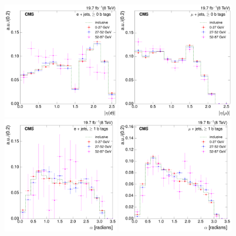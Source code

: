 \begin{figure}[hbtp]
    \centering
     \includegraphics[width=0.45\textwidth]{Chapters/07_08_09_Analysis/Images/8TeV/fit_variables/electron/MET/electron_absolute_eta/qcd/MET_electron_absolute_eta_0orMoreBtag_QCD_template_comparison}\hfill
     \includegraphics[width=0.45\textwidth]{Chapters/07_08_09_Analysis/Images/8TeV/fit_variables/muon/MET/muon_absolute_eta/qcd/MET_muon_absolute_eta_0orMoreBtag_QCD_template_comparison}\\
     \includegraphics[width=0.45\textwidth]{Chapters/07_08_09_Analysis/Images/8TeV/fit_variables/electron/MET/angle_bl/qcd/MET_angle_bl_1orMoreBtag_QCD_template_comparison}\hfill
     \includegraphics[width=0.45\textwidth]{Chapters/07_08_09_Analysis/Images/8TeV/fit_variables/muon/MET/angle_bl/qcd/MET_angle_bl_1orMoreBtag_QCD_template_comparison}\\

\end{figure}
